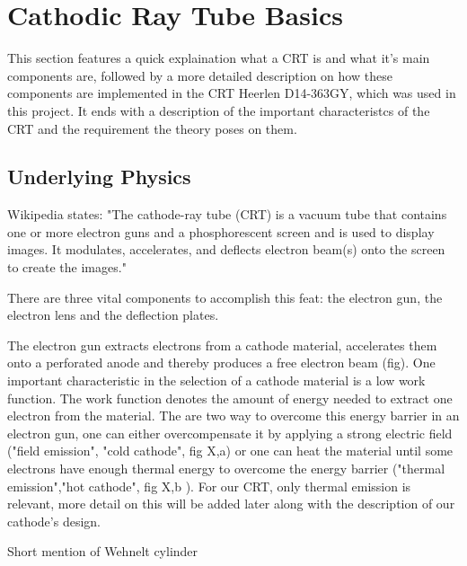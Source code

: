 
\chapter{Cathodic Ray Tube Basics}

This section features a quick explaination what a CRT is and what it's main components are, followed by a more detailed description on how these components are implemented in the CRT Heerlen D14-363GY, which was used in this project. It ends with a description of the important characteristcs of the CRT and the requirement the theory poses on them.

\section{Underlying Physics}

Wikipedia states: "The cathode-ray tube (CRT) is a vacuum tube that contains one or more electron guns and a phosphorescent screen and is used to display images. It modulates, accelerates, and deflects electron beam(s) onto the screen to create the images."

There are three vital components to accomplish this feat: the electron gun, the electron lens and the deflection plates. 

The electron gun extracts electrons from a cathode material, accelerates them onto a perforated anode and thereby produces a free electron beam (fig). One important characteristic in the selection of a cathode material is a low work function. The work function denotes the amount of energy needed to extract one electron from the material. The are two way to overcome this energy barrier in an electron gun, one can either overcompensate it by applying a strong electric field ("field emission", "cold cathode", fig X,a)  or one can heat the material until some electrons have enough thermal energy to overcome the energy barrier ("thermal emission","hot cathode", fig X,b ). For our CRT, only thermal emission is relevant, more detail on this will be added later along with the description of our cathode's design. 

Short mention of Wehnelt cylinder  

